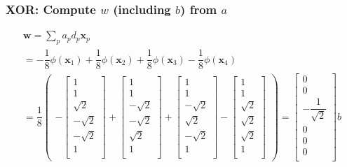 \documentclass[12pt,notes,mathserif]{beamer}
\begin{document}
\begin{frame}[c]
\frametitle{XOR: Compute $w$ (including $b$) from $a$}
\begin{gather*}
\mathbf{w}=\sum_pa_pd_p\mathbf{x}_p\\
=
-\dfrac18\phi(\mathbf{x}_1)
+\dfrac18\phi(\mathbf{x}_2)
+\dfrac18\phi(\mathbf{x}_3)
-\dfrac18\phi(\mathbf{x}_4)\\
=\dfrac{1}{8}
\begin{pmatrix}
-\begin{bmatrix}
1\\
1\\
\sqrt2\\
-\sqrt2\\
-\sqrt2\\
1\\
\end{bmatrix}
+\begin{bmatrix}
1\\
1\\
-\sqrt2\\
-\sqrt2\\
\sqrt2\\
1\\
\end{bmatrix}
+\begin{bmatrix}
1\\
1\\
-\sqrt2\\
\sqrt2\\
-\sqrt2\\
1\\
\end{bmatrix}
-\begin{bmatrix}
1\\
1\\
\sqrt2\\
\sqrt2\\
\sqrt2\\
1\\
\end{bmatrix}
\end{pmatrix}=
\begin{bmatrix}
0\\
0\\
-\dfrac{1}{\sqrt2}\\
0\\
0\\
0\\
\end{bmatrix}b
\end{gather*}
\end{frame}
\end{document}
